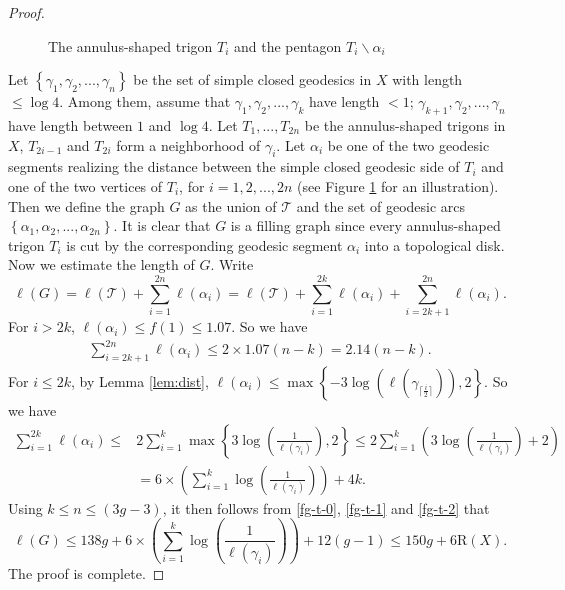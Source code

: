 \documentclass[UTF8]{amsart}
\numberwithin{equation}{section}
\theoremstyle{definition}
\theoremstyle{example}
\theoremstyle{remark}
\begin{document}
\begin{proof}
\begin{figure}[htbp]
	\caption{The annulus-shaped trigon $T_i$ and the pentagon $T_i \backslash \alpha_i$}
	\label{fig:trigon_cut}
\end{figure}	

\noindent Let $\left\{ \gamma_1, \gamma_2, ..., \gamma_n \right\} $ be the set of simple closed geodesics in $X$ with length $ \le \log 4$. Among them, assume that $ \gamma_1, \gamma_2, ..., \gamma_k $ have length $ < 1$; $ \gamma_{k+1}, \gamma_2, ..., \gamma_n  $ have length between $1$ and $\log 4$. Let $T_1, ..., T_{2n}$ be the annulus-shaped trigons in $X$, $T_{2i-1}$ and $T_{2i}$ form a neighborhood of $\gamma_i$. Let $\alpha_i$ be one of the two geodesic segments realizing the distance between the simple closed geodesic side of $T_i$ and one of the two vertices of $T_i$, for $i=1,2, ..., 2n$ (see Figure \ref{fig:trigon_cut} for an illustration). Then we define the graph $G$ as the union of $\mathcal{T}$ and the set of geodesic arcs $\left\{ \alpha_1, \alpha_2, ..., \alpha_{2n} \right\} $. It is clear that $G$ is a filling graph since every annulus-shaped trigon $T_i$ is cut by the corresponding geodesic segment $\alpha_i$ into a topological disk. Now we estimate the length of $G$. Write
\[\ell(G)= \ell(\mathcal{T}) + \sum_{i=1}^{2n} \ell(\alpha_i)=\ell(\mathcal{T}) + \sum_{i=1}^{2k} \ell(\alpha_i)+ \sum_{i=2k+1}^{2n} \ell(\alpha_i).\]
For $i > 2k$, $\ell(\alpha_i) \le f(1) \le  1.07$. So we have
\begin{equation}\label{fg-t-1}
\begin{aligned}
   \sum_{i=2k+1}^{2n} \ell(\alpha_i)\leq  2\times 1.07(n-k) =2.14(n-k).
\end{aligned}
\end{equation}
For $i \le 2k$, by Lemma \ref{lem:dist}, $\ell(\alpha_i) \le \max\left\{-3\log\left(\ell\left(\gamma_{\lceil \frac{i}{2} \rceil}\right)\right), 2\right\}.$ So we have 
\begin{equation}\label{fg-t-2}
\begin{aligned}
   \sum_{i=1}^{2k} \ell(\alpha_i)\leq &  2 \sum_{i=1}^{k} \max\left\{3\log\left(\frac{1}{\ell(\gamma_i)}\right), 2\right\}\leq 2 \sum_{i=1}^{k} \left(3\log\left(\frac{1}{\ell(\gamma_i)}\right)+2\right)\\
   &=6\times \left(\sum_{i=1}^{k} \log\left(\frac{1}{\ell(\gamma_i)}\right)\right)+4k.
\end{aligned}
\end{equation}
Using $k\leq n \leq (3g-3)$, it then follows from \eqref{fg-t-0}, \eqref{fg-t-1} and \eqref{fg-t-2} that
\[\ell(G)\le 138g+6\times \left(\sum_{i=1}^{k} \log\left(\frac{1}{\ell(\gamma_i)}\right)\right)+12(g-1)\le 150g+6\mathrm{R}(X).\]
The proof is complete.
\end{proof}
\end{document}
